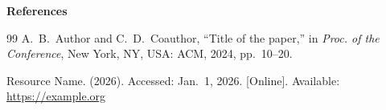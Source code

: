 \documentclass[12pt,a4paper]{extarticle}
\begin{document}
\bigskip
\noindent\textbf{References}
\vspace{-0.3em}
\renewcommand{\refname}{}
\begin{thebibliography}{99}
  A.~B.~Author and C.~D.~Coauthor, \enquote{Title of the paper,} in \emph{Proc. of the Conference}, New York, NY, USA: ACM, 2024, pp.~10--20.

  Resource Name. (2026). Accessed: Jan.~1, 2026. [Online]. Available: \url{https://example.org}
\end{thebibliography}
\end{document}
